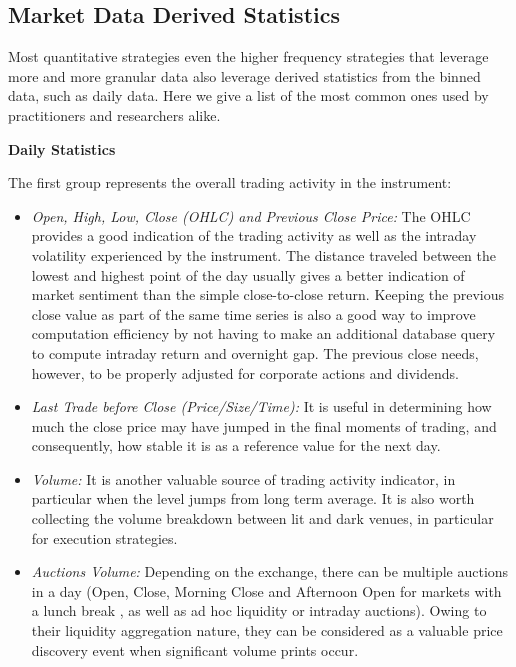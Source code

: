 \subsection{Market Data Derived Statistics\label{sec:market_data_derived}}

Most quantitative strategies even the higher frequency strategies that leverage more and more granular data also leverage derived statistics from the binned data, such as daily data. Here we give a list of the most common ones used by practitioners and researchers alike. \twomedskip


\noindent\textbf{Daily Statistics} \twomedskip

The first group represents the overall trading activity in the instrument: 

\begin{itemize}
\item \emph{Open, High, Low, Close (OHLC) and Previous Close Price:} The OHLC provides a good indication of the trading activity as well as the intraday volatility experienced by the instrument. The distance traveled between the lowest and highest point of the day usually gives a better indication of market sentiment than the simple close-to-close return. Keeping the previous close value as part of the same time series is also a good way to improve computation efficiency by not having to make an additional database query to compute intraday return and overnight gap. The previous close needs, however, to be properly adjusted for corporate actions and dividends. 


\item \emph{Last Trade before Close (Price/Size/Time):} It is useful in determining how much the close price may have jumped in the final moments of trading, and consequently, how stable it is as a reference value for the next day.


\item \emph{Volume:} It is another valuable source of trading activity indicator, in particular when the level jumps from long term average. It is also worth collecting the volume breakdown between lit and dark venues, in particular for execution strategies.


\item \emph{Auctions Volume:} Depending on the exchange, there can be multiple auctions in a day (Open, Close, Morning Close and Afternoon Open for markets with a lunch break , as well as ad hoc liquidity or intraday auctions). Owing to their liquidity aggregation nature, they can be considered as a valuable price discovery event when significant volume prints occur.



\end{itemize}

